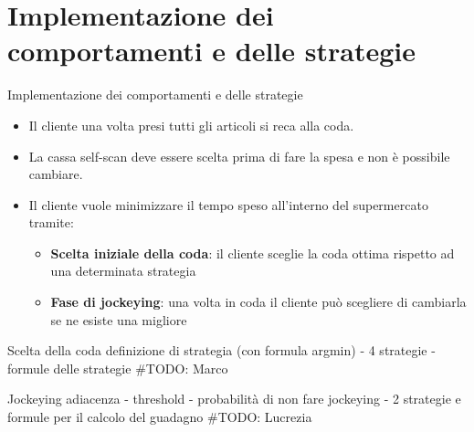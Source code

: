 \section{Implementazione dei comportamenti e delle strategie}





\begin{frame}{Implementazione dei comportamenti e delle strategie}
	\begin{itemize}
		\item Il cliente una volta presi tutti gli articoli si reca alla coda.
		\item La cassa self-scan deve essere scelta prima di fare la spesa e non è possibile cambiare.
		\item Il cliente vuole minimizzare il tempo speso all'interno del supermercato tramite:
		\begin{itemize}
			\item \textbf{Scelta iniziale della coda}: il cliente sceglie la coda ottima rispetto ad una determinata strategia
			\item \textbf{Fase di jockeying}: una volta in coda il cliente può scegliere di cambiarla se ne esiste una migliore
		\end{itemize}
	\end{itemize}
\end{frame}





\begin{frame}{Scelta della coda}
	\centering
	definizione di strategia (con formula argmin) - 4 strategie - formule delle strategie
	\#TODO: Marco

\end{frame}





\begin{frame}{Jockeying}
	\centering
	adiacenza - threshold - probabilità di non fare jockeying - 2 strategie e formule per il calcolo del guadagno
	\#TODO: Lucrezia
\end{frame}